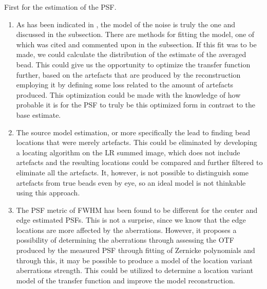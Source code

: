 First for the estimation of the \ac{PSF}.
\begin{enumerate}
   \item%
       As has been indicated in , the model of the noise is truly the one and discussed in the subsection.
        There are methods for fitting the model, one of which was cited and commented upon in the subsection.
        If this fit was to be made, we could calculate the distribution of the estimate of the averaged bead.
        This could give us the opportunity to optimize the transfer function further, based on the artefacts that are produced
            by the reconstruction employing it by defining some loss related to the amount of artefacts produced.
        This optimization could be made with the knowledge of how probable it is for the \ac{PSF} to truly be this optimized 
            form in contrast to the base estimate.
    \item%
        The source model estimation, or more specifically the  lead to finding bead
            locations that were merely artefacts. 
        This could be eliminated by developing a locating algorithm on the \ac{LR} summed image, which does not include
            artefacts and the resulting locations could be compared and further filtered to eliminate all the artefacts.
        It, however, is not possible to distinguish some artefacts from true beads even by eye, so an ideal model is not
            thinkable using this approach.
    \item%
        The \ac{PSF} metric of \ac{FWHM} has been found to be different for the center and edge estimated \acp{PSF}.
        This is not a surprise, since we know that the edge locations are more affected by the aberrations.
        However, it proposes a possibility of determining the aberrations through assessing the \ac{OTF} produced by the
            measured \ac{PSF} through fitting of Zernicke polynomials  and through this, it may be 
            possible to produce a model of the location variant aberrations strength.
        This could be utilized to determine a location variant model of the transfer function and improve the model
            reconstruction.
\end{enumerate}

